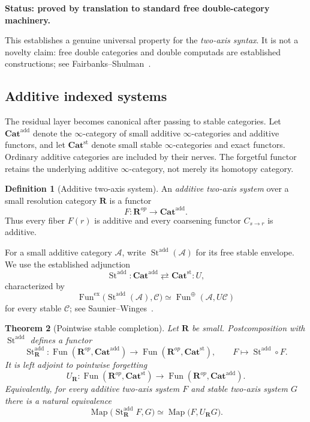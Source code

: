 \documentclass[11pt]{article}
\newtheorem{theorem}{Theorem}[section]
\theoremstyle{definition}
\newtheorem{definition}[theorem]{Definition}
\theoremstyle{remark}
\newcommand{\Rcat}{\mathbf R}
\newcommand{\status}[1]{\textbf{Status: #1.}}
\begin{document}
\status{proved by translation to standard free double-category machinery}

This establishes a genuine universal property for the \emph{two-axis syntax}. It is not a novelty claim: free double categories and double computads are established constructions; see Fairbanks--Shulman~\cite{FairbanksShulman2026}.

\subsection{Additive indexed systems}

The residual layer becomes canonical after passing to stable categories. Let $\mathbf{Cat}^{\mathrm{add}}$ denote the $\infty$-category of small additive $\infty$-categories and additive functors, and let $\mathbf{Cat}^{\mathrm{st}}$ denote small stable $\infty$-categories and exact functors. Ordinary additive categories are included by their nerves. The forgetful functor retains the underlying additive $\infty$-category, not merely its homotopy category.

\begin{definition}[Additive two-axis system]
An \emph{additive two-axis system} over a small resolution category $\Rcat$ is a functor
\[
F:\Rcat^{op}\longrightarrow \mathbf{Cat}^{\mathrm{add}}.
\]
Thus every fiber $F(r)$ is additive and every coarsening functor $C_{s\to r}$ is additive.
\end{definition}

For a small additive category $\mathcal A$, write $\operatorname{St}^{\mathrm{add}}(\mathcal A)$ for its free stable envelope. We use the established adjunction
\[
\operatorname{St}^{\mathrm{add}}:
\mathbf{Cat}^{\mathrm{add}}
\rightleftarrows
\mathbf{Cat}^{\mathrm{st}}:U,
\]
characterized by
\[
\operatorname{Fun}^{\mathrm{ex}}
\bigl(\operatorname{St}^{\mathrm{add}}(\mathcal A),\mathcal C\bigr)
\simeq
\operatorname{Fun}^{\oplus}(\mathcal A,U\mathcal C)
\]
for every stable $\mathcal C$; see Saunier--Winges~\cite{SaunierWinges2026}.

\begin{theorem}[Pointwise stable completion]\label{thm:pointwise-stable}
Let $\Rcat$ be small. Postcomposition with $\operatorname{St}^{\mathrm{add}}$ defines a functor
\[
\operatorname{St}^{\mathrm{add}}_{\Rcat}:
\operatorname{Fun}(\Rcat^{op},\mathbf{Cat}^{\mathrm{add}})
\longrightarrow
\operatorname{Fun}(\Rcat^{op},\mathbf{Cat}^{\mathrm{st}}),
\qquad
F\longmapsto \operatorname{St}^{\mathrm{add}}\circ F.
\]
It is left adjoint to pointwise forgetting
\[
U_{\Rcat}:
\operatorname{Fun}(\Rcat^{op},\mathbf{Cat}^{\mathrm{st}})
\longrightarrow
\operatorname{Fun}(\Rcat^{op},\mathbf{Cat}^{\mathrm{add}}).
\]
Equivalently, for every additive two-axis system $F$ and stable two-axis system $G$ there is a natural equivalence
\[
\operatorname{Map}
\bigl(\operatorname{St}^{\mathrm{add}}_{\Rcat}F,G\bigr)
\simeq
\operatorname{Map}
\bigl(F,U_{\Rcat}G\bigr).
\]
\end{theorem}
\end{document}
